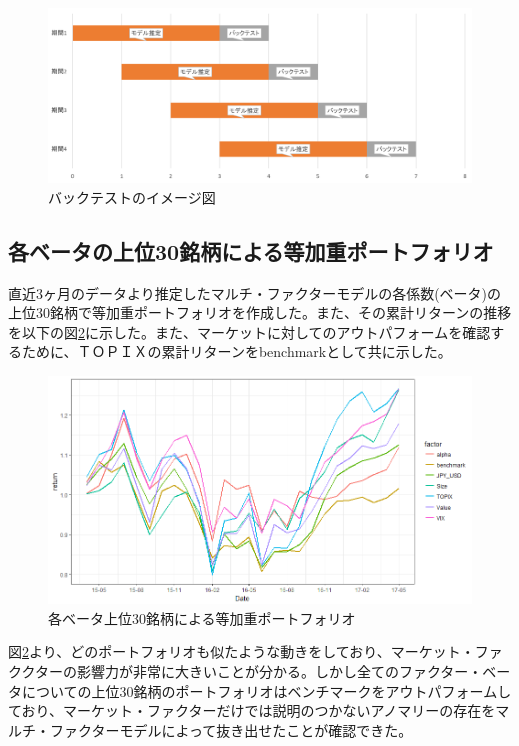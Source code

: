 \documentclass[11pt]{jreport}
\begin{document}
\begin{figure}[H]
	\begin{center}
		\includegraphics[width=15cm]{./fig/backtest.png}
		\caption{バックテストのイメージ図}
		\label{fig:backtest}
	\end{center}
\end{figure}

\subsection{各ベータの上位30銘柄による等加重ポートフォリオ}
直近3ヶ月のデータより推定したマルチ・ファクターモデルの各係数(ベータ)の上位30銘柄で等加重ポートフォリオを作成した。また、その累計リターンの推移を以下の図\ref{fig:factor_top30}に示した。また、マーケットに対してのアウトパフォームを確認するために、ＴＯＰＩＸの累計リターンをbenchmarkとして共に示した。


\begin{figure}[H]
	\begin{center}
		\includegraphics[width=15cm]{./fig/factor_top30.png}
		\caption{各ベータ上位30銘柄による等加重ポートフォリオ}
		\label{fig:factor_top30}
	\end{center}
\end{figure}


図\ref{fig:factor_top30}より、どのポートフォリオも似たような動きをしており、マーケット・ファククターの影響力が非常に大きいことが分かる。しかし全てのファクター・ベータについての上位30銘柄のポートフォリオはベンチマークをアウトパフォームしており、マーケット・ファクターだけでは説明のつかないアノマリーの存在をマルチ・ファクターモデルによって抜き出せたことが確認できた。
\end{document}
